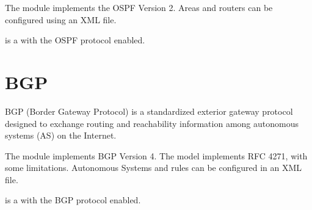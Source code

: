 The  module implements the OSPF Version 2. Areas and routers
can be configured using an XML file.

 is a  with the OSPF protocol enabled.


\section{BGP}
\label{sec:routing:bgp}

BGP (Border Gateway Protocol) is a standardized exterior gateway protocol
designed to exchange routing and reachability information among
autonomous systems (AS) on the Internet.

The  module implements BGP Version 4. The model implements
RFC 4271, with some limitations. Autonomous Systems and rules can be
configured in an XML file.

 is a  with the BGP protocol enabled.


